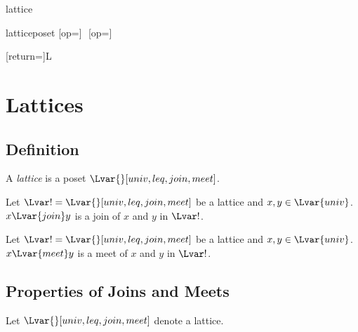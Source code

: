 \documentclass{stex}
\begin{document}
\begin{smodule}{lattice}

  \begin{extstructure}{lattice}{poset}
    [op=\vee]{\,\vee\,}
    [op=\wedge]{\,\wedge\,}
  \end{extstructure}

  [return={\lattice[comp=##1]}]{\mathcal L}

  \section{Lattices}

  \begin{forthel}
  \end{forthel}
  
  \subsection{Definition}

  \begin{forthel}
    \begin{signature*}
      A \emph{lattice} is a poset $\Lvar{}[univ,leq,join,meet]$.
    \end{signature*}
  \end{forthel}
  
  \begin{forthel}
    \begin{signature*}
      Let $\Lvar! = \Lvar{}[univ,leq,join,meet]$ be a lattice and $x, y \in \Lvar{univ}$.
      $x {\Lvar{join}} y$ is a join of $x$ and $y$ in $\Lvar!$.
    \end{signature*}

    \begin{signature*}
      Let $\Lvar! = \Lvar{}[univ,leq,join,meet]$ be a lattice and $x, y \in \Lvar{univ}$.
      $x {\Lvar{meet}} y$ is a meet of $x$ and $y$ in $\Lvar!$.
    \end{signature*}
  \end{forthel}

  \subsection{Properties of Joins and Meets}

  \begin{forthel}
    Let $\Lvar{}[univ,leq,join,meet]$ denote a lattice.


\end{forthel}
\end{smodule}
\end{document}
